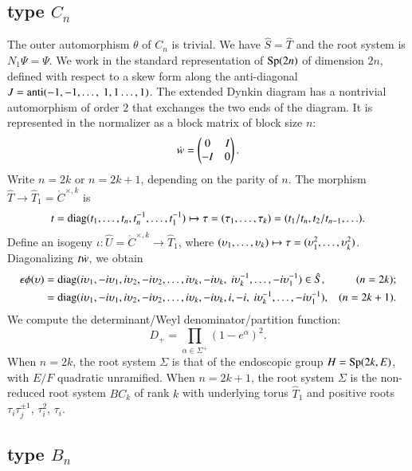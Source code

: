 \subsection{type $C_n$}

The outer automorphism $\theta$ of $C_n$ is trivial.  We have $\hat S
= \hat T$ and the root system is $N_1\Psi =\Psi$.  We work in the
standard representation of ${\operatorname{Sp}}(2n)$ of dimension $2n$, defined
with respect to a skew form along the anti-diagonal $J =
{\operatorname{anti}}(-1,-1,\ldots,\ 1,1\ldots,1)$.  The extended Dynkin diagram
has a nontrivial automorphism of order $2$ that exchanges the two ends
of the diagram.  It is represented in the normalizer as a block matrix
of block size $n$:
\[
\dot w = \begin{pmatrix} 0 &I \\ -I & 0\end{pmatrix}.
\]
Write $n = 2k$ or $n = 2k+1$, depending on the parity of $n$.  The
morphism $\hat T\to \hat T_1=\ring{C}^{\times,k}$ is
\[
t = {\operatorname{diag}}(t_1,\ldots,t_n,t_n^{-1},\ldots,t_1^{-1})
\mapsto \tau=(\tau_1,\ldots,\tau_k)=(t_1/t_n,t_2/t_{n-1},\ldots).
\]
Define an isogeny $\iota:\hat U=\ring{C}^{\times,k} \to \hat T_1$,
where $(\upsilon_1,\ldots,\upsilon_k)\mapsto \tau=(\upsilon_1^2,\ldots,\upsilon_k^2)$.
Diagonalizing $t\dot w$, we obtain
\begin{align*}
\epsilon\phi(\upsilon) 
&= {\operatorname{diag}}(i \upsilon_1,-i\upsilon_1,i\upsilon_2,-i\upsilon_2,\ldots,i\upsilon_k,
-i\upsilon_k,\ i\upsilon_k^{-1},\ldots, -i\upsilon_1^{-1})\in \hat S,
& (n = 2k);\\
    &= {\operatorname{diag}}(i \upsilon_1,-i\upsilon_1,i\upsilon_2,-i\upsilon_2,\ldots,i\upsilon_k,-i\upsilon_k,i,
  -i,\ i\upsilon_k^{-1},\ldots, -i\upsilon_1^{-1}),
& (n = 2k+1).\\
\end{align*}
We compute the determinant/Weyl denominator/partition function:
\begin{equation}
D_+ = \prod_{\alpha\in \Sigma^+} (1-e^\alpha)^2.
\end{equation}
When $n=2k$, the root system $\Sigma$ is that of the endoscopic group
$H={\operatorname{Sp}}(2k,E)$, with $E/F$ quadratic unramified.  When $n=2k+1$,
the root system $\Sigma$ is the non-reduced root system $BC_k$ of rank
$k$ with underlying torus $\hat T_1$ and positive roots $\tau_i
\tau_j^{\pm 1}$, $\tau_i^2$, $\tau_i$.

\subsection{type $B_n$}

